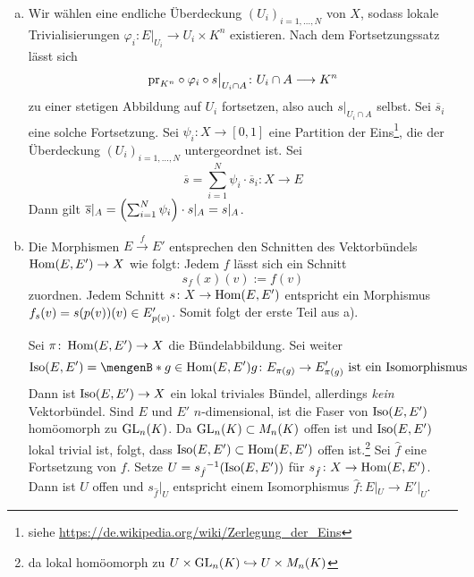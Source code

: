 \begin{enumerate}[a)]
	\item Wir wählen eine endliche Überdeckung $(U_i)_{i=1,\ldots ,N}$ von $X$, sodass lokale Trivialisierungen $\varphi_i \colon E|_{U_i} \to U_i \times K^n$ existieren. Nach 
	dem Fortsetzungssatz lässt sich 
	\[
		\pr_{K^n} \circ \varphi_i \circ s\big|_{U_i \cap A} \colon U_i \cap A \longrightarrow K^n 
	\]
	zu einer stetigen Abbildung auf $U_i$ fortsetzen, also auch $s|_{U_i \cap A}$ selbst. Sei $\overline{s}_i$ eine solche Fortsetzung. Sei $\psi_i \colon X \to [0,1]$ eine 
	Partition der Eins\footnote{siehe \url{https://de.wikipedia.org/wiki/Zerlegung_der_Eins}}, die der Überdeckung $(U_i)_{i=1,\ldots ,N}$ untergeordnet ist. Sei
	\[
		\overline{s} = \sum_{i=1}^{N} \psi_i \cdot \overline{s}_i \colon X \longrightarrow E 
	\]
	Dann gilt $\overline{s}|_A = \enbrace*{\sum_{i=1}^{N} \psi_i} \cdot s|_A= s|_A$.
	\item Die Morphismen $E \xrightarrow{f} E'$ entsprechen den Schnitten des Vektorbündels $\Hom(E,E') \to X$ wie folgt: Jedem $f$ lässt sich ein Schnitt
	\[
		s_f(x)(v) := f(v)
	\]
	zuordnen. Jedem Schnitt $s \colon X \to \Hom(E,E')$ entspricht ein Morphismus $f_s(v)=s \enbrace*{p(v)}(v) \in E'_{p(v)}$. Somit folgt der erste Teil aus a).
	
	Sei $\pi \colon \Hom(E,E') \to X$ die Bündelabbildung. Sei weiter
	\[
		\Iso(E,E') = \set[g \in \Hom(E,E')]{g \colon E_{\pi(g)} \to E'_{\pi(g)} \text{ ist ein Isomorphismus}} 
	\]
	Dann ist $\Iso(E,E') \to X$ ein lokal triviales Bündel, allerdings \emph{kein} Vektorbündel. Sind $E$ und $E'$ $n$-dimensional, ist die Faser von $\Iso(E,E')$ homöomorph
	zu $\GL_n(K)$. Da $\GL_n(K) \subset M_n(K)$ offen ist und $\Iso(E,E')$ lokal trivial ist, folgt, dass $\Iso(E,E') \subset \Hom(E,E')$ offen ist.\footnote{da lokal 
	homöomorph zu $U \times \GL_n(K) \hookrightarrow U \times M_n(K)$} Sei $\hat{f}$ eine Fortsetzung von $f$. Setze 
	$U = {s_{\hat{f}}}\mkern-0.5mu^{-1} \enbrace*{\Iso(E,E')}$ für $s_{\hat{f}} \colon X \to \Hom(E,E')$. Dann ist $U$ offen und $s_{\hat{f}}|_U$ entspricht einem 
	Isomorphismus $\hat{f} \colon E|_U \to E'|_U$. \bewende
\end{enumerate}

